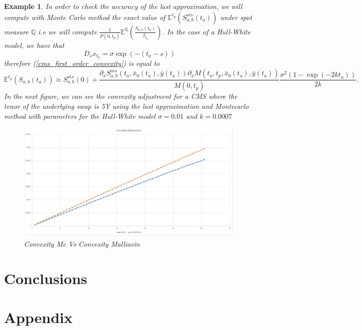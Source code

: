 \documentclass[a4paper,10pt]{article}
\newtheorem{example}[theorem]{Example}
\newcommand{\1}{\mathbf{1}}
\begin{document}
\begin{example}
In order to check the accuracy of the last approximation, we will compute with Monte Carlo method the exact value of $\mathbb{E}^{t_p}\left(S^{ois}_{a,b}(t_a)\right)$ under spot measure $\mathbb{Q}$ i.e we will compute  $\frac{1}{P(0,t_p)}  \mathbb{E}^{\mathbb{Q}}\left(\frac{S_{a,b}(t_a)}{\beta_{t_a}} \right)$. In the case of a Hull-White model, we have that
$$
D_s x_{t_a} = \sigma \exp(-(t_a - s))
$$
therefore (\ref{cms_first_order_convexity}) is equal to
\begin{equation*}
\mathbb{E}^{t_p}\left(S_{a,b}(t_a)\right) \approx  S^{ois}_{a,b}(0) + \frac{\partial_x S^{ois}_{a,b}(t_a, \bar{x}_0(t_a),\bar{y}(t_a))\partial_x M(t_a,t_p, \bar{x}_0(t_a),\bar{y}(t_a))}{M(0,t_p)} \frac{\sigma^{2}(1-\exp(-2kt_a))}{2k}.
\end{equation*}
In the next figure, we can see the convexity adjustment for a CMS where the tenor of the underlying swap is 5Y using the last approximation and Montecarlo method with parameters for the Hull-White model $\sigma=0.01$ and $k=0.0007$

\begin{figure}[h]
	\begin{center}
		\includegraphics[scale=0.25]{Figures/cms_convexity_order.jpg}
		\caption{Convexity Mc Vs Convexity Malliavin}
	\end{center}
\end{figure} 
\end{example}

\section{Conclusions}\label{sec:Conclusion}



\section*{Appendix}
\appendix
\renewcommand{\thesection}{\Alph{section}.\arabic{section}}
\end{document}
